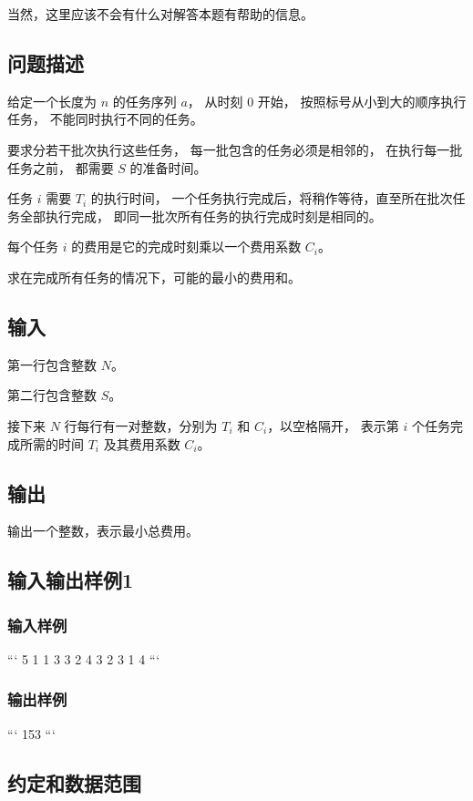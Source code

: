 \documentclass[UTF8]{ctexart}
\begin{document}
当然，这里应该不会有什么对解答本题有帮助的信息。

\subsection{问题描述}

给定一个长度为 $n$ 的任务序列 $a$， 从时刻 $0$ 开始， 按照标号从小到大的顺序执行任务， 不能同时执行不同的任务。

要求分若干批次执行这些任务， 每一批包含的任务必须是相邻的， 在执行每一批任务之前， 都需要 $S$ 的准备时间。

任务 $i$ 需要 $T_i$ 的执行时间， 一个任务执行完成后，将稍作等待，直至所在批次任务全部执行完成， 即同一批次所有任务的执行完成时刻是相同的。

每个任务 $i$ 的费用是它的完成时刻乘以一个费用系数 $C_i$。

求在完成所有任务的情况下，可能的最小的费用和。

\subsection{输入} 

第一行包含整数 $N$。

第二行包含整数 $S$。

接下来 $N$ 行每行有一对整数，分别为 $T_i$ 和 $C_i$，以空格隔开， 表示第 $i$ 个任务完成所需的时间 $T_i$ 及其费用系数 $C_i$。

\subsection{输出}

输出一个整数，表示最小总费用。

\subsection{输入输出样例1}

\subsubsection{输入样例}

```
5
1
1 3
3 2
4 3
2 3
1 4
```

\subsubsection{输出样例}

```
153
```

\subsection{约定和数据范围}
\end{document}
